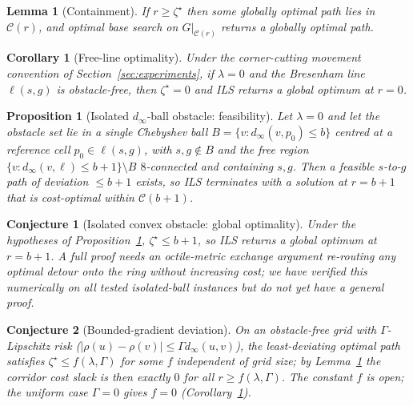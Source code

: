 \documentclass[preprint,12pt,authoryear]{elsarticle}
\newtheorem{proposition}{Proposition}
\newtheorem{corollary}{Corollary}
\newtheorem{lemma}{Lemma}
\newtheorem{conjecture}{Conjecture}
\begin{document}
\begin{lemma}[Containment]\label{lem:containment}
If $r \geq \zeta^\star$ then some globally optimal path lies in $\mathcal{C}(r)$, and optimal base search on $G|_{\mathcal{C}(r)}$ returns a globally optimal path.
\end{lemma}

\begin{corollary}[Free-line optimality]\label{cor:freeline}
Under the corner-cutting movement convention of Section~\ref{sec:experiments}, if $\lambda = 0$ and the Bresenham line $\ell(s,g)$ is obstacle-free, then $\zeta^\star = 0$ and ILS returns a global optimum at $r = 0$.
\end{corollary}

\begin{proposition}[Isolated $d_\infty$-ball obstacle: feasibility]\label{prop:isolated_feas}
Let $\lambda = 0$ and let the obstacle set lie in a single Chebyshev ball $B = \{v: d_\infty(v,p_0) \leq b\}$ centred at a reference cell $p_0 \in \ell(s,g)$, with $s,g \notin B$ and the free region $\{v: d_\infty(v,\ell) \leq b+1\}\setminus B$ $8$-connected and containing $s,g$. Then a feasible $s$-to-$g$ path of deviation $\leq b+1$ exists, so ILS terminates with a solution at $r = b+1$ that is cost-optimal within $\mathcal{C}(b+1)$.
\end{proposition}

\begin{conjecture}[Isolated convex obstacle: global optimality]\label{cj:convex}
Under the hypotheses of Proposition~\ref{prop:isolated_feas}, $\zeta^\star \leq b+1$, so ILS returns a \emph{global} optimum at $r = b+1$. A full proof needs an octile-metric exchange argument re-routing any optimal detour onto the ring without increasing cost; we have verified this numerically on all tested isolated-ball instances but do not yet have a general proof.
\end{conjecture}

\begin{conjecture}[Bounded-gradient deviation]\label{cj:gradient}
On an obstacle-free grid with $\Gamma$-Lipschitz risk ($|\rho(u)-\rho(v)| \leq \Gamma d_\infty(u,v)$), the least-deviating optimal path satisfies $\zeta^\star \leq f(\lambda,\Gamma)$ for some $f$ independent of grid size; by Lemma~\ref{lem:containment} the corridor cost slack is then exactly $0$ for all $r \geq f(\lambda,\Gamma)$. The constant $f$ is open; the uniform case $\Gamma = 0$ gives $f = 0$ (Corollary~\ref{cor:freeline}).
\end{conjecture}
\end{document}
